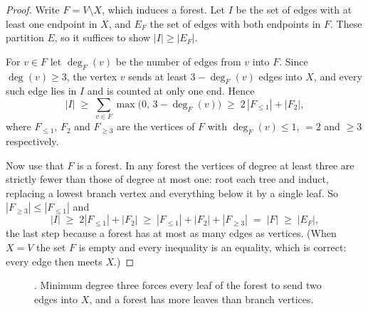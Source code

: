 \begin{proof}
Write $F = V \setminus X$, which induces a forest. Let $I$ be the set of edges
with at least one endpoint in $X$, and $E_F$ the set of edges with both
endpoints in $F$. These partition $E$, so it suffices to show
$|I| \ge |E_F|$.

For $v \in F$ let $\deg_F(v)$ be the number of edges from $v$ into $F$. Since
$\deg(v) \ge 3$, the vertex $v$ sends at least $3 - \deg_F(v)$ edges into $X$, and
every such edge lies in $I$ and is counted at only one end. Hence
\[ |I| \;\ge\; \sum_{v \in F} \max\bigl(0,\, 3 - \deg_F(v)\bigr)
       \;\ge\; 2\,|F_{\le 1}| + |F_2|, \]
where $F_{\le 1}$, $F_2$ and $F_{\ge 3}$ are the vertices of $F$ with
$\deg_F(v) \le 1$, $=2$ and $\ge 3$ respectively.

Now use that $F$ is a forest. In any forest the vertices of degree at least
three are strictly fewer than those of degree at most one: root each tree and
induct, replacing a lowest branch vertex and everything below it by a single
leaf. So $|F_{\ge 3}| \le |F_{\le 1}|$ and
\[ |I| \;\ge\; 2|F_{\le 1}| + |F_2|
       \;\ge\; |F_{\le 1}| + |F_2| + |F_{\ge 3}| \;=\; |F| \;\ge\; |E_F|, \]
the last step because a forest has at most as many edges as vertices. (When
$X = V$ the set $F$ is empty and every inequality is an equality, which is
correct: every edge then meets $X$.)
\end{proof}

\begin{figure}[ht]
\centering
{}
\caption{. Minimum degree three forces every leaf of
the forest to send two edges into $X$, and a forest has more leaves than branch
vertices.}
\label{fig:fvs-lemma}
\end{figure}


